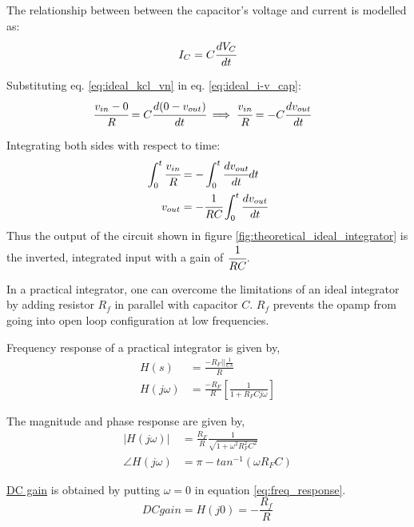 \documentclass[12pt, titlepage]{article}
\theoremstyle{definition}
\begin{document}
    The relationship between between the capacitor's voltage and current is modelled as:
    \begin{equation}\label{eq:ideal_i-v_cap}
      I_C = C\cfrac{dV_C}{dt}
    \end{equation}

    Substituting eq. \ref{eq:ideal_kcl_vn} in eq. \ref{eq:ideal_i-v_cap}:
    \begin{align*}
      \cfrac{v_{in} - 0}{R} &= C\cfrac{d(0 - v_{out})}{dt}
      \implies \cfrac{v_{in}}{R} = -C\cfrac{dv_{out}}{dt}
    \end{align*}

    Integrating both sides with respect to time:
    \begin{align*}
      \int_0^t {\cfrac{v_{in}}{R}} &= - \int_0^t {\cfrac{dv_{out}}{dt}dt} \\
      v_{out} &= -\cfrac{1}{RC} \int_0^t {\cfrac{dv_{out}}{dt}}
    \end{align*}
    Thus the output of the circuit shown in figure \ref{fig:theoretical_ideal_integrator} is the inverted, integrated input with a gain of $\cfrac{1}{RC}$.

    In a practical integrator, one can overcome the limitations of an ideal integrator by adding resistor $R_{f}$ in parallel with capacitor $C$.
    $R_{f}$ prevents the opamp from going into open loop configuration at low frequencies.

    Frequency response of a practical integrator is given by,
    \begin{align}\label{eq:freq_response}
      H(s) &= \frac{-R_{F} || \frac{1}{Cs}}{R} \\
      H(j\omega) &= \frac{-R_{F}}{R} \left[ \frac{1}{1+R_{F}Cj\omega} \right]
    \end{align}

    The magnitude and phase response are given by,
    \begin{align*}
    |H(j\omega)| &= \frac{R_{F}}{R}\frac{1}{\sqrt{1+\omega^{2}R_{F}^{2}C^{2}}} \\
    \angle H(j\omega) &= \pi - tan^{-1}(\omega R_{F}C)
    \end{align*}

    \underline{DC gain} is obtained by putting $\omega = 0$ in equation \ref{eq:freq_response}.
    \begin{equation}
      DC gain = H(j0) = -\frac{R_f}{R}
    \end{equation}
\end{document}
